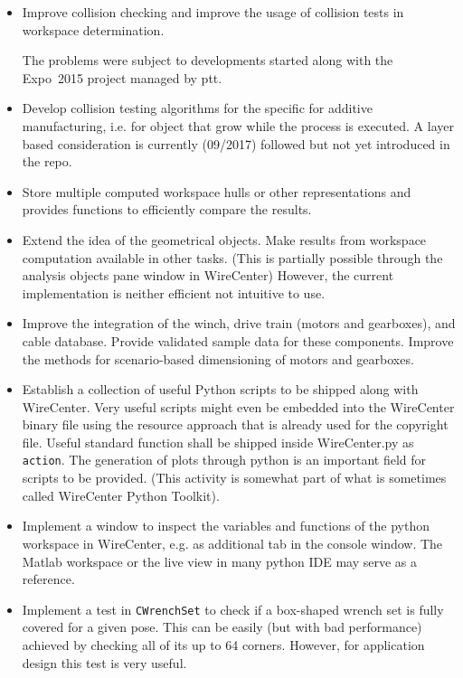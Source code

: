 \documentclass[11pt,a4paper,onepage,openany]{book}
\begin{document}
\begin{itemize}
\item Improve collision checking and improve the usage of collision tests in
    workspace determination.

    The problems were subject to developments started along with the
    Expo~2015 project managed by ptt.

\item Develop collision testing algorithms for the specific for additive
    manufacturing, i.e. for object that grow while the process is executed.
    A layer based consideration is currently (09/2017) followed but not yet
    introduced in the repo.

\item Store multiple computed workspace hulls or other representations and
    provides functions to efficiently compare the results.

\item Extend the idea of the geometrical objects. Make results from workspace
    computation available in other tasks. (This is partially possible through
    the analysis objects pane window in WireCenter) However, the current
    implementation is neither efficient not intuitive to use.

\item Improve the integration of the winch, drive train (motors and
    gearboxes), and cable database. Provide validated sample data for these
    components. Improve the methods for scenario-based dimensioning of motors
    and gearboxes.

\item Establish a collection of useful Python scripts to be shipped along
    with WireCenter. Very useful scripts might even be embedded into the
    WireCenter binary file using the resource approach that is already used
    for the copyright file. Useful standard function shall be shipped inside
    WireCenter.py as \texttt{action}. The generation of plots through python
    is an important field for scripts to be provided. (This activity is
    somewhat part of what is sometimes called WireCenter Python Toolkit).

\item Implement a window to inspect the variables and functions of the python
    workspace in WireCenter, e.g. as additional tab in the console window.
    The Matlab workspace or the live view in many python IDE may serve as a
    reference.

\item Implement a test in \texttt{CWrenchSet} to check if a box-shaped wrench
    set is fully covered for a given pose. This can be easily (but with bad
    performance) achieved by checking all of its up to 64 corners. However,
    for application design this test is very useful.


\end{itemize}
\end{document}
